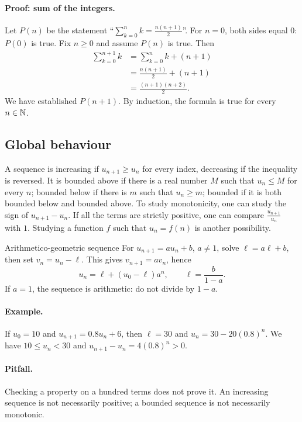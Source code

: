 \paragraph{Proof: sum of the integers.} Let $P(n)$ be the statement ``$\sum_{k=0}^n k=\frac{n(n+1)}{2}$''.
For $n=0$, both sides equal $0$: $P(0)$ is true.
Fix $n\ge0$ and assume $P(n)$ is true. Then
\[\begin{aligned}\sum_{k=0}^{n+1}k&=\sum_{k=0}^nk+(n+1)\\&=\frac{n(n+1)}2+(n+1)\\&=\frac{(n+1)(n+2)}2.\end{aligned}\]
We have established $P(n+1)$. By induction, the formula is true for every $n\in\mathbb N$.
\subsection{Global behaviour}
A sequence is increasing if $u_{n+1}\ge u_n$ for every index, decreasing if the inequality is reversed. It is bounded above if there is a real number $M$ such that $u_n\le M$ for every $n$; bounded below if there is $m$ such that $u_n\ge m$; bounded if it is both bounded below and bounded above.
To study monotonicity, one can study the sign of $u_{n+1}-u_n$. If all the terms are strictly positive, one can compare $\frac{u_{n+1}}{u_n}$ with $1$. Studying a function $f$ such that $u_n=f(n)$ is another possibility.
\begin{methode}{Arithmetico-geometric sequence}
For $u_{n+1}=au_n+b$, $a\ne1$, solve $\ell=a\ell+b$, then set $v_n=u_n-\ell$. This gives $v_{n+1}=av_n$, hence
\[u_n=\ell+(u_0-\ell)a^n,\qquad\ell=\frac{b}{1-a}.\]
If $a=1$, the sequence is arithmetic: do not divide by $1-a$.
\end{methode}
\paragraph{Example.} If $u_0=10$ and $u_{n+1}=0.8u_n+6$, then $\ell=30$ and $u_n=30-20(0.8)^n$. We have $10\le u_n<30$ and $u_{n+1}-u_n=4(0.8)^n>0$.
\paragraph{Pitfall.} Checking a property on a hundred terms does not prove it. An increasing sequence is not necessarily positive; a bounded sequence is not necessarily monotonic.


